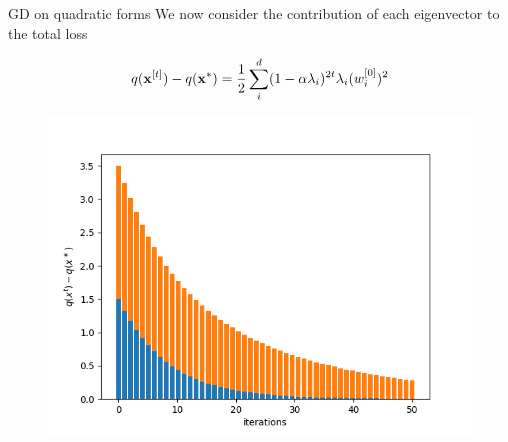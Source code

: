 \documentclass[11pt,compress,t,notes=noshow, xcolor=table]{beamer}
\begin{document}
\begin{vbframe}{GD on quadratic forms}
We now consider the contribution of each eigenvector to the total loss

$$
	q(\mathbf{x}^{[ t ] }) - q(\mathbf{x}^\ast) = \frac{1}{2} \sum_{i}^{d} (1 - \alpha \lambda_i)^{2t} \lambda_i (w_i^{[0]})^2 
$$

\begin{figure}
	\includegraphics[height=0.35\textwidth, keepaspectratio]{figure_man/gd_conv.png} \\
\end{figure}



\end{vbframe}
\end{document}
